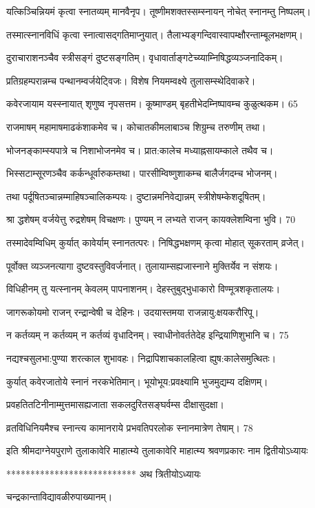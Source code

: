 यत्किञ्चिन्नियमं कृत्वा स्नातव्यम् मानवैनृप।
तूष्णीमशक्तस्सम्स्नायन् नोचेत् स्नानम्तु निष्पलम्।

तस्मात्स्नानविधिं कृत्वा स्नात्वासद्गतिमाप्नुयात्।
तैलाभ्यङ्गन्दिवास्वापम्क्षौरन्ताम्बूलभक्षणम्।

दुराचाराशनञ्चैव स्त्रीसङ्गं दुष्टसङ्गतिम्।
वृधावार्ताङ्गटेच्य्याम्निषिद्धव्यञ्जनादिकम्।

प्रतिग्रहम्परान्नम्च पन्थानम्वर्जयेट्विजः।
विशेष नियमम्वक्ष्ये तुलासम्स्थेदिवाकरे।

कवेरजायाम यस्स्नायात् शृणुष्व नृपसत्तम।
कूष्माण्डम् बृहतीभेदम्निष्पावम्च कुळुत्थकम। 65

राजमाषम् महामाषमाढकंशाकमेव च।
कोचातकीमलाबाञ्च शिग्रुम्च तरुणीम् तथा।

भोजनङ्काम्स्यपात्रे च निशाभोजनमेव च।
प्रात:कालेच मध्याह्नसायम्काले तथैव च।

भिस्सटाम्सूरणञ्चैव कर्कन्धूर्वारुकम्तथा।
पारसीम्विष्णुशाकम्च बालैर्जगदम्च भोजनम्।

तथा पर्दूषितञ्चान्नम्माहिषञ्चालिकम्पयः।
दुष्टान्नमनिवेद्यान्नम् स्त्रीशेषम्केशदूषितम्।

श्रा द्धशेषम् वर्जयेत्तु रुद्रशेषम् विचक्षणः।
पुण्यम् न लभ्यते राजन् कायक्लेशम्विना भुवि। 70

तस्मादेवम्विधिम् कुर्यात् कावेर्याम् स्नानतत्परः।
निषिद्धभक्षणम् कृत्वा मोहात् सूकरताम् व्रजेत्।

पूर्वोक्त व्यञ्जनत्यागा दुष्टवस्तुविवर्जनात्।
तुलायाम्सह्यजास्नाने मुक्तिर्येव न संशयः।

विधिहीनम् तु यत्स्नानम् केवलम् पापनाशनम्।
देहस्तुबुद्भुधाकारो विण्मूत्रशकृतालयः।

जागरूकोयमो राजन् रन्द्रान्वेषी च देहिनः।
उदयास्तमया राजन्नायु:क्षयकरौरिपू।

न कर्तव्यम् न कर्तव्यम् न कर्तव्यं वृधादिनम्।
स्वाधीनोवर्ततेदेह इन्द्रियाणिशुभानि च। 75

नद्यश्चसुलभा:पुण्या शरत्काल शुभावहः।
निद्रापिशाचकालहित्वा ह्युष:कालेसमुत्थितः।

कुर्यात् कवेरजातोये स्नानं नरकभेतिमान्।
भूयोभूय:प्रवक्ष्यामि भुजमुद्यम्य दक्षिणम्।

प्रवहतितटिनीनाम्मुत्तमासह्यजाता
सकलदुरितसङ्घर्वम्स दीक्षासुदक्षा।

व्रतविधिनियमैश्च स्नान्त्य कामानराये
प्रभवतिपरलोक स्नानमात्रेण तेषाम्। 78

इति श्रीमदाग्नेयपुराणे तुलाकावेरि माहात्म्ये तुलाकावेरि माहात्म्य श्रवणप्रकारः नाम द्वितीयोऽध्यायः

***************************
अथ त्रितीयोऽध्यायः

चन्द्रकान्ताविद्यावळीरुपाख्यानम्।


